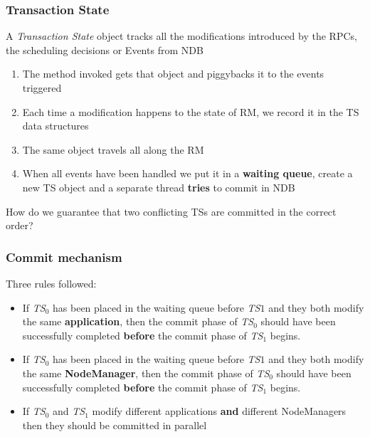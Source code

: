 \documentclass{beamer}
\begin{document}
\begin{frame}
\frametitle{Transaction State}
A \emph{Transaction State} object tracks all the modifications
introduced by the RPCs, the scheduling decisions or Events from NDB

\begin{enumerate}
\item The method invoked gets that object and piggybacks it to the
  events triggered
\item Each time a modification happens to the state of RM, we record
  it in the TS data structures
\item The same object travels all along the RM
\item When all events have been handled we put it in a \textbf{waiting
    queue}, create a new TS object and a separate thread \textbf{tries} to commit in NDB
\end{enumerate}

\pause
\vfill
\centering
{\color{red} How do we guarantee that two conflicting TSs are
  committed in the correct order?}
\end{frame}

\begin{frame}
\frametitle{Commit mechanism}
Three rules followed:

\begin{itemize}
\item<1,4> If \emph{TS$_0$} has been placed in the waiting queue before
  \emph{TS$1$} and they both modify the same \textbf{application},
  then the commit phase of \emph{TS$_0$} should have been successfully
  completed \textbf{before} the commit phase of \emph{TS$_1$} begins.

\item<2,4> If \emph{TS$_0$} has been placed in the waiting queue before
  \emph{TS$1$} and they both modify the same \textbf{NodeManager},
  then the commit phase of \emph{TS$_0$} should have been successfully
  completed \textbf{before} the commit phase of \emph{TS$_1$} begins.

\item<3,4> If \emph{TS$_0$} and \emph{TS$_1$} modify different
  applications \textbf{and} different NodeManagers then they should be
  committed in parallel
\end{itemize}
\end{frame}
\end{document}
